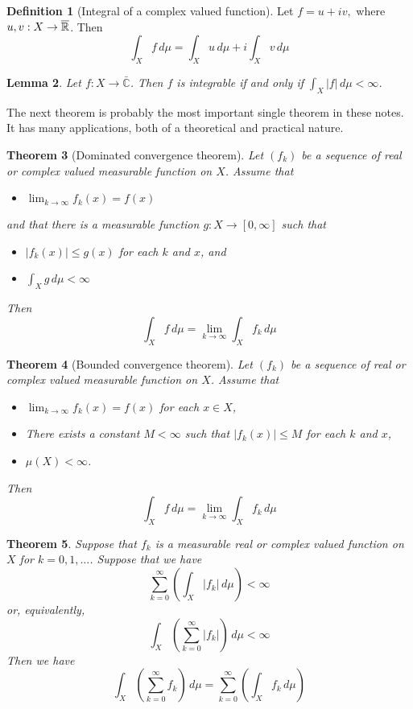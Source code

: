 \documentclass[10pt, oneside, reqno]{amsart}
\theoremstyle{plain}%
\newtheorem{thm}{Theorem}[section]
\newtheorem{lem}[thm]{Lemma}
\theoremstyle{definition}
\newtheorem{defn}[thm]{Definition}
\theoremstyle{remark}
\newcommand{\dmu}{\, d \mu}
\begin{document}
\begin{defn}[Integral of a complex valued function]
	Let $f = u + iv,$ where $u,v : X \rightarrow \overline{\mathbb{R}}$.  Then \[
		\int_X f \dmu = \int_X u \dmu + i \int_X v \dmu
	\]
\end{defn}
\begin{lem}
	Let $f : X \rightarrow \bar{\mathbb{C}}$.  Then $f$ is integrable if and only if $\int_X |f| \dmu < \infty$.
\end{lem}


The next theorem is probably the most important single theorem in these notes.  It has many applications, both of a theoretical and practical nature.
\begin{thm}[Dominated convergence theorem]
	Let $(f_k)$ be a sequence of real or complex valued measurable function on $X$. Assume that \begin{itemize}
		\item $\lim_{k \rightarrow \infty} f_k(x) = f(x)$
	\end{itemize}
	and that there is a measurable function $g: X \rightarrow [0,\infty]$ such that 
	\begin{itemize}
		\item $|f_k(x)| \leq g(x)$ for each $k$ and $x$, and 
	\end{itemize}
	
	\begin{itemize}
		\item $\int_X g \dmu < \infty$
	\end{itemize}
	Then \[
		\int_X f \dmu = \lim_{k \rightarrow \infty} \int_X f_k \dmu
	\]
\end{thm}



\begin{thm}[Bounded convergence theorem]
	Let $(f_k)$ be a sequence of real or complex valued measurable function on $X$.  Assume that \begin{itemize}
		\item $\lim_{k \rightarrow \infty} f_k(x) = f(x)$ for each $x \in X$,
		\item There exists a constant $M < \infty$ such that $|f_k(x)| \leq M$ for each $k$ and $x$,
		\item $\mu(X) < \infty$.
	\end{itemize}
	Then \[
		\int_X f \dmu = \lim_{k \rightarrow \infty} \int_X f_k \dmu
	\]
	\end{thm}

\begin{thm}
	Suppose that $f_k$ is a measurable real or complex valued function on $X$ for $k = 0,1,\dots$.  Suppose that we have \[
		\sum_{k = 0}^\infty \left(\int_X |f_k| \dmu \right) < \infty
	\] or, equivalently,
	\[
		\int_X \left( \sum_{k = 0}^\infty |f_k| \right) \dmu < \infty
	\]
	Then we have \[
	\int_X \left( \sum_{k = 0}^\infty f_k \right) \dmu =
	\sum_{k = 0}^\infty \left(\int_X f_k \dmu \right)	
	\]
\end{thm}
\end{document}

